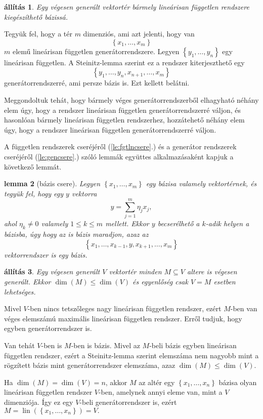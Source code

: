 \documentclass[9pt, a4paper, showtrims]{memoir}
\makeatletter
\renewenvironment{proof}[1][\proofname]
    {\par\pushQED{\qed}%
    \normalfont \topsep6\p@\@plus6\p@\relax
    \trivlist
    \item[\hskip\labelsep
        \itshape
    #1\@addpunct{:}]\ignorespaces}
    {\popQED\endtrivlist\@endpefalse}
\theoremstyle{plain}
\newtheorem{proposition}{állítás}[chapter]
\newtheorem{lemma}[proposition]{lemma}
\theoremstyle{remark}
\theoremstyle{definition}
\DeclareMathOperator{\lin}{lin}
\makeatother
\begin{document}
\begin{proposition}
	Egy végesen generált vektortér bármely lineárisan független rendszere kiegészíthető bázissá.
	\label{pr:lfgtenbazissa}
\end{proposition}
\begin{proof}
	Tegyük fel, hogy a tér $m$ dimenziós, ami azt jelenti, hogy van
	\[
		\left\{ x_1,\ldots,x_m \right\}
	\]
	$m$ elemű lineárisan független generátorrendszere.
	Legyen $\left\{ y_1,\ldots,y_n \right\}$ egy lineárisan független.
	A Steinitz-lemma szerint ez a rendszer kiterjeszthető egy
	\[
		\left\{ y_1,\ldots,y_n,x_{n+1},\ldots,x_m \right\}
	\]
	generátorrendszerré, ami persze bázis is.
	Ezt kellett belátni.
\end{proof}

Meggondoltuk tehát, hogy bármely véges generátorrendszerből elhagyható néhány elem úgy,
hogy a rendszer lineárisan független generátorrendszerré váljon,
és hasonlóan bármely lineárisan független rendszerhez, hozzátehető néhány elem úgy, hogy a
rendszer lineárisan független generátorrendszerré váljon.

A független rendszerek cseréjéről (\ref{le:fgtlncsere}.) és a generátor rendszerek cseréjéről (\ref{le:gencsere}.) szóló lemmák
együttes alkalmazásaként kapjuk a következő lemmát.

\begin{lemma}[bázis csere]\label{le:baziscsere}
	Legyen $\left\{ x_1,\ldots,x_m \right\}$ egy bázisa valamely vektortérnek,
	és tegyük fel,
	hogy egy $y$ vektorra
	\[
		y=\sum_{j=1}^m\eta_jx_j,
	\]
	ahol $\eta_k\neq 0$ valamely $1\leq k\leq m$ mellett.
	Ekkor $y$ becserélhető a $k$-adik helyen a bázisba,
	úgy hogy az is bázis maradjon, azaz az
	\[
		\left\{ x_1,\ldots,x_{k-1},y,x_{k+1},\ldots,x_m \right\}
	\]
	vektorrendszer is egy bázis.
\end{lemma}

\begin{proposition}
	Egy végesen generált $V$ vektortér minden $M\subseteq V$ altere is végesen generált.
    Ekkor $\dim(M)\leq \dim(V)$ és egyenlőség csak $V=M$ esetben lehetséges.
\end{proposition}
\begin{proof}
	Mivel $V$-ben nincs tetszőleges nagy lineárisan független rendszer,
	ezért $M$-ben van véges elemszámú maximális lineárisan független rendszer.
	Erről tudjuk, hogy egyben generátorrendszer is.

	Van tehát $V$-ben is $M$-ben is bázis.
	Mivel az $M$-beli bázis egyben lineárisan független rendszer,
	ezért a Steinitz-lemma szerint 
    elemszáma nem nagyobb mint a rögzített bázis mint generátorrendszer elemszáma,
    azaz $\dim(M)\leq \dim(V).$

    Ha $\dim(M)=\dim(V)=n$, akkor $M$ az altér egy $\left\{ x_1,\ldots,x_n \right\}$ bázisa olyan lineárisan független rendszer $V$-ben, 
    amelynek annyi eleme van, mint a $V$ dimenziója.
    Így ez egy $V$-beli generátorrendszer is, ezért 
    $M=\lin\left( \left\{ x_1,\ldots,x_n \right\}\right)=V. $
\end{proof}
\end{document}
